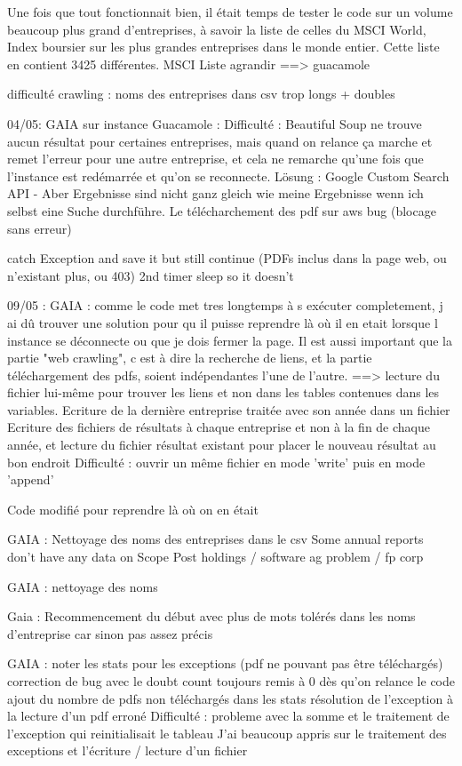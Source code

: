 Une fois que tout fonctionnait bien, il était temps de tester le code sur un volume beaucoup plus grand d'entreprises, à savoir la liste de celles du MSCI World, Index boursier sur les plus grandes entreprises dans le monde entier.
Cette liste en contient 3425 différentes.
MSCI Liste agrandir ==> guacamole 

difficulté crawling : noms des entreprises dans csv trop longs + doubles

04/05:
GAIA sur instance Guacamole : Difficulté : Beautiful Soup ne trouve aucun résultat pour certaines entreprises, mais quand on relance ça marche et remet l’erreur pour une autre entreprise, et cela ne remarche qu’une fois que l’instance est redémarrée et qu’on se reconnecte. 
Lösung : Google Custom Search API - Aber Ergebnisse sind nicht ganz gleich wie meine Ergebnisse wenn ich selbst eine Suche durchführe.
Le télécharchement des pdf sur aws bug (blocage sans erreur)

catch Exception and save it but still continue (PDFs inclus dans la page web, ou n'existant plus, ou 403)
2nd timer sleep so it doesn’t  

09/05 :
GAIA : comme le code met tres longtemps à s exécuter completement, j ai dû trouver une solution pour qu il puisse reprendre là où il en etait lorsque l instance se déconnecte ou que je dois fermer la page. 
Il est aussi important que la partie "web crawling", c est à dire la recherche de liens, et la partie téléchargement des pdfs, soient indépendantes l'une de l'autre.
==> lecture du fichier lui-même pour trouver les liens et non dans les tables contenues dans les variables.
Ecriture de la dernière entreprise traitée avec son année dans un fichier
Ecriture des fichiers de résultats à chaque entreprise et non à la fin de chaque année, et lecture du fichier résultat existant pour placer le nouveau résultat au bon endroit
Difficulté : ouvrir un même fichier en mode 'write' puis en mode 'append'

Code modifié pour reprendre là où on en était

GAIA : 
Nettoyage des noms des entreprises dans le csv
Some annual reports don’t have any data on Scope
Post holdings / software ag problem / fp corp

GAIA : nettoyage des noms

Gaia : Recommencement du début avec plus de mots tolérés dans les noms d’entreprise car sinon pas assez précis

GAIA : noter les stats pour les exceptions (pdf ne pouvant pas être téléchargés)
correction de bug avec le doubt count toujours remis à 0 dès qu’on relance le code
ajout du nombre de pdfs non téléchargés dans les stats
résolution de l’exception à la lecture d’un pdf erroné
Difficulté : probleme avec la somme et le traitement de l’exception qui reinitialisait le tableau
J’ai beaucoup appris sur le traitement des exceptions et l’écriture / lecture d’un fichier

